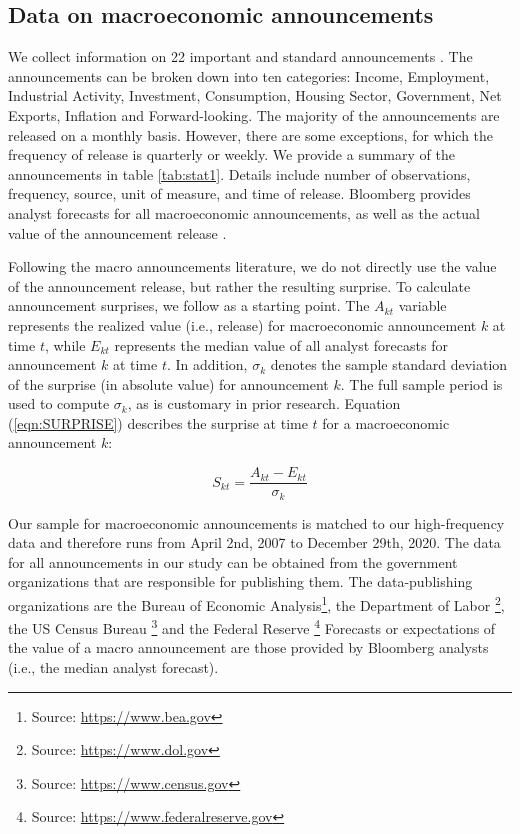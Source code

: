 \documentclass[12pt]{article}
\begin{document}
\subsection{Data on macroeconomic announcements}
 
We collect information on 22 important and standard announcements \citep*[see e.g.,][]{andersen1998deutsche,kurov2019price}. The announcements can be broken down into ten categories: Income, Employment, Industrial Activity, Investment, Consumption, Housing Sector, Government, Net Exports, Inflation and Forward-looking. The majority of the announcements are released on a monthly basis. However, there are some exceptions, for which the frequency of release is quarterly or weekly. We provide a summary of the announcements in table \ref{tab:stat1}. Details include number of observations, frequency, source, unit of measure, and time of release. Bloomberg provides analyst forecasts for all macroeconomic announcements, as well as the actual value of the announcement release \citep*[see e.g.,][]{kurov2019price}. 

Following the  macro announcements literature, we do not directly use the value of the announcement release, but rather the resulting surprise. To calculate announcement surprises, we follow \citet*{balduzzi2001economic} as a starting point. The  $A_{kt}$ variable represents the realized value (i.e., release) for macroeconomic announcement $k$ at time $t$, while $E_{kt}$ represents the median value of all analyst forecasts for announcement $k$ at time $t$. In addition, $\sigma_k$ denotes the sample standard deviation of the surprise (in absolute value) for announcement $k$. The full sample period is used to compute $\sigma_k$, as is customary in prior research. Equation (\ref{eqn:SURPRISE}) describes the surprise at time $t$ for a macroeconomic announcement $k$:

\begin{equation}\label{eqn:SURPRISE}
S_{kt}=\frac{A_{kt}-E_{kt}}{\sigma_k}
\end{equation}

Our sample for macroeconomic announcements is matched to our high-frequency data and therefore runs from April 2nd, 2007 to December 29th, 2020. The data for all announcements in our study can be obtained from the government organizations that are responsible for publishing them. The data-publishing organizations are the Bureau of Economic Analysis\footnote{Source: \url{https://www.bea.gov}}, the Department of Labor \footnote{Source: \url{https://www.dol.gov}}, the US Census Bureau \footnote{Source: \url{https://www.census.gov}} and the Federal Reserve \footnote{Source: \url{https://www.federalreserve.gov}}
Forecasts or expectations of the value of a macro announcement are those provided by Bloomberg analysts (i.e., the median analyst forecast).
\end{document}
